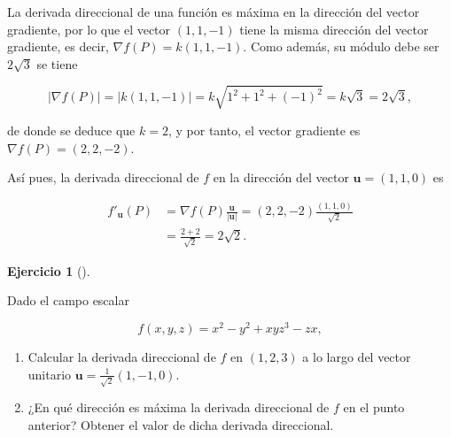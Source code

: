 \documentclass[
  spanish,
  a4paper,
]{scrreport}
\theoremstyle{definition}
\newtheorem{exercise}{Ejercicio}[chapter]
\theoremstyle{remark}
\begin{document}
\begin{tcolorbox}[enhanced jigsaw, arc=.35mm, bottomrule=.15mm, bottomtitle=1mm, breakable, colback=white, colbacktitle=quarto-callout-tip-color!10!white, colframe=quarto-callout-tip-color-frame, coltitle=black, left=2mm, leftrule=.75mm, opacityback=0, opacitybacktitle=0.6, rightrule=.15mm, title=\textcolor{quarto-callout-tip-color}{\faLightbulb}\hspace{0.5em}{Solución}, titlerule=0mm, toprule=.15mm, toptitle=1mm]

La derivada direccional de una función es máxima en la dirección del
vector gradiente, por lo que el vector \((1, 1, -1)\) tiene la misma
dirección del vector gradiente, es decir, \(\nabla f(P) = k(1, 1, -1)\).
Como además, su módulo debe ser \(2\sqrt{3}\) se tiene

\[
|\nabla f(P)| = |k(1,1,-1)| = k\sqrt{1^2+1^2+(-1)^2} 
= k\sqrt{3} = 2\sqrt{3},
\]

de donde se deduce que \(k=2\), y por tanto, el vector gradiente es
\(\nabla f(P) = (2, 2, -2)\).

Así pues, la derivada direccional de \(f\) en la dirección del vector
\(\mathbf{u}=(1,1,0)\) es

\begin{align*}
f'_{\mathbf{u}}(P)
&= \nabla f(P)\frac{\mathbf{u}}{|\mathbf{u}|}
= (2, 2, -2)\frac{(1, 1, 0)}{\sqrt{2}} \\
&= \frac{2 + 2}{\sqrt{2}}
= 2\sqrt{2}.
\end{align*}

\end{tcolorbox}

\begin{exercise}[]\protect\hypertarget{exr-derivada-direccional-3}{}\label{exr-derivada-direccional-3}

Dado el campo escalar

\[
f(x,y,z) = x^2-y^2+xyz^3-zx,
\]

\begin{enumerate}
\def\labelenumi{\alph{enumi}.}
\item
  Calcular la derivada direccional de \(f\) en \((1,2,3)\) a lo largo
  del vector unitario \(\mathbf{u}=\frac{1}{\sqrt2}(1,-1,0)\).
\item
  ¿En qué dirección es máxima la derivada direccional de \(f\) en el
  punto anterior? Obtener el valor de dicha derivada direccional.
\end{enumerate}

\end{exercise}
\end{document}
